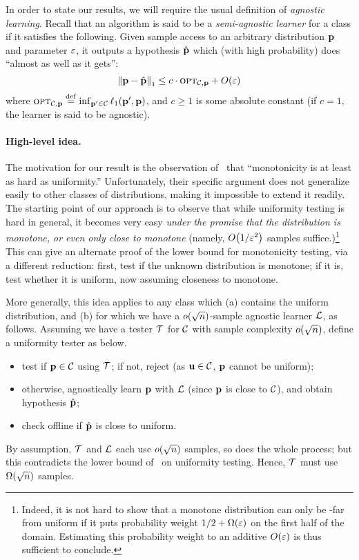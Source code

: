 
In order to state our results, we will require the usual definition of \emph{agnostic learning}. Recall that an algorithm is said to be a \emph{semi-agnostic learner} for a class \class if it satisfies the following. Given sample access to an arbitrary distribution $\D$ and parameter $\eps$, it outputs a hypothesis $\hat{\D}$ which (with high probability) does ``almost as well as it gets'':
\[
	\normone{\D - \hat{\D}} \leq c\cdot\opt_{\class,\D} + \bigO{\eps}
\]
where $\opt_{\class,\D}\eqdef \inf_{\D^\prime\in\class} \lp[1](\D^\prime,\D)$, and $c\geq 1$ is some absolute constant (if $c=1$, the learner is said to be agnostic).

\paragraph{High-level idea.} The motivation for our result is the observation of~\cite{BKR:04} that ``monotonicity is at least as hard as uniformity.'' Unfortunately, their specific argument does not generalize easily to other classes of distributions, making it impossible to extend it readily. The starting point of our approach is to observe that while uniformity testing is hard in general, it becomes very easy \emph{under the promise that the distribution is monotone, or even only close to monotone} (namely, $\bigO{1/\eps^2}$ samples suffice.)\footnote{Indeed, it is not hard to show that a monotone distribution can only be \eps-far from uniform if it puts probability weight $1/2+\bigOmega{\eps}$ on the first half of the domain. Estimating this probability weight to an additive $O(\eps)$ is thus sufficient to conclude.} This can give an alternate proof of the lower bound for monotonicity testing, via a different reduction: first, test if  the unknown distribution is monotone; if it is, test whether it is uniform, now assuming closeness to monotone.

More generally, this idea applies to any class \class which \textsf{(a)} contains the uniform distribution, and \textsf{(b)} for which we have a $\littleO{\sqrt{n}}$-sample agnostic learner $\Learner$, as follows.
Assuming we have a tester $\Tester$ for $\class$ with sample complexity $\littleO{\sqrt{n}}$, define a uniformity tester as below.
\begin{itemize}
  \item test if $\D\in\class$ using $\Tester$; if not, reject (as $\uniform\in\class$, $\D$ cannot be uniform);
  \item otherwise, agnostically learn $\D$ with $\Learner$ (since $\D$ is close to $\class$), and obtain hypothesis $\hat{\D}$;
  \item check offline if $\hat{\D}$ is close to uniform.
\end{itemize} 
By assumption, $\Tester$ and $\Learner$ each use $\littleO{\sqrt{n}}$ samples, so does the whole process; but this contradicts the lower bound of~\cite{BFRSW:00,Paninski:08} on uniformity testing. Hence, $\Tester$ must use $\bigOmega{\sqrt{n}}$ samples.\medskip

